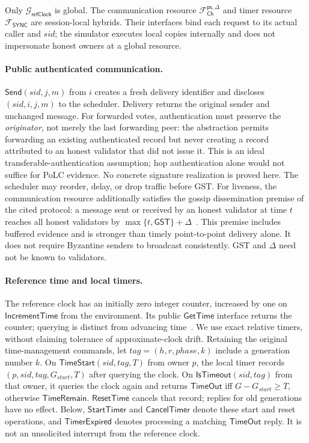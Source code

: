 \documentclass[conference,letterpaper,10pt]{IEEEtran}
\begin{document}
Only $\mathcal{G}_{\scriptscriptstyle\mathsf{refClock}}$ is global. The communication resource $\mathcal{F}_{\scriptscriptstyle\mathsf{Ch}}^{\mathsf{ps},\Delta}$ and timer resource $\mathcal{F}_{\scriptscriptstyle\mathsf{SYNC}}$ are session-local hybrids. Their interfaces bind each request to its actual caller and $sid$; the simulator executes local copies internally and does not impersonate honest owners at a global resource.

\paragraph{Public authenticated communication.}
$\mathsf{Send}(sid,j,m)$ from $i$ creates a fresh delivery identifier and discloses $(sid,i,j,m)$ to the scheduler. Delivery returns the original sender and unchanged message. For forwarded votes, authentication must preserve the \emph{originator}, not merely the last forwarding peer: the abstraction permits forwarding an existing authenticated record but never creating a record attributed to an honest validator that did not issue it. This is an ideal transferable-authentication assumption; hop authentication alone would not suffice for PoLC evidence. No concrete signature realization is proved here. The scheduler may reorder, delay, or drop traffic before GST. For liveness, the communication resource additionally satisfies the gossip dissemination premise of the cited protocol: a message sent or received by an honest validator at time $t$ reaches all honest validators by $\max\{t,\mathsf{GST}\}+\Delta$~\cite{buchman2018latest}. This premise includes buffered evidence and is stronger than timely point-to-point delivery alone. It does not require Byzantine senders to broadcast consistently. GST and $\Delta$ need not be known to validators.

\paragraph{Reference time and local timers.}
The reference clock has an initially zero integer counter, increased by one on $\mathsf{IncrementTime}$ from the environment. Its public $\mathsf{GetTime}$ interface returns the counter; querying is distinct from advancing time~\cite{canetti2017universally}. We use exact relative timers, without claiming tolerance of approximate-clock drift. Retaining the original time-management commands, let $tag=(h,r,phase,k)$ include a generation number $k$. On $\mathsf{TimeStart}(sid,tag,T)$ from owner $p$, the local timer records $(p,sid,tag,G_{start},T)$ after querying the clock. On $\mathsf{IsTimeout}(sid,tag)$ from that owner, it queries the clock again and returns $\mathsf{TimeOut}$ iff $G-G_{start}\geq T$, otherwise $\mathsf{TimeRemain}$. $\mathsf{ResetTime}$ cancels that record; replies for old generations have no effect. Below, $\mathsf{StartTimer}$ and $\mathsf{CancelTimer}$ denote these start and reset operations, and $\mathsf{TimerExpired}$ denotes processing a matching $\mathsf{TimeOut}$ reply. It is not an unsolicited interrupt from the reference clock.
\end{document}
